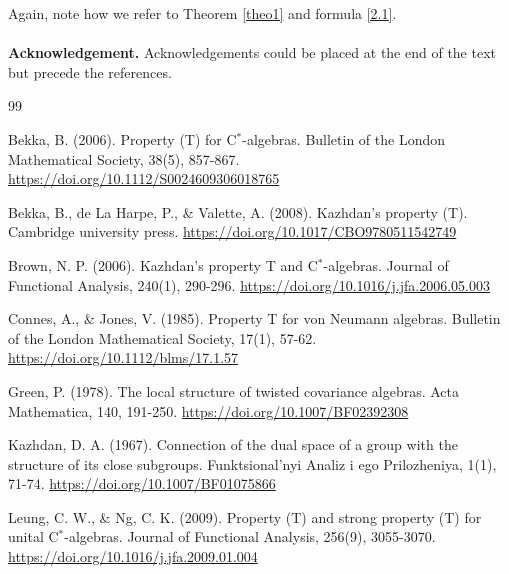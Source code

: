 \documentclass{article}
\begin{document}
Again, note how we refer to Theorem \ref{theo1} and formula \eqref{2.1}.
\\
\\
{\bf Acknowledgement.} Acknowledgements could be placed at the end
of the text but precede the references.



\begin{thebibliography}{99}

 Bekka, B. (2006). Property (T) for C$^*$-algebras. Bulletin of the London Mathematical Society, 38(5), 857-867.
\url{https://doi.org/10.1112/S0024609306018765}

  Bekka, B., de La Harpe, P., \& Valette, A. (2008). Kazhdan's property (T). Cambridge university press.
\url{https://doi.org/10.1017/CBO9780511542749}

 Brown, N. P. (2006). Kazhdan's property T and C$^*$-algebras. Journal of Functional Analysis, 240(1), 290-296.
\url{https://doi.org/10.1016/j.jfa.2006.05.003}


  Connes, A., \& Jones, V. (1985). Property T for von Neumann algebras. Bulletin of the London Mathematical Society, 17(1), 57-62.
\url{https://doi.org/10.1112/blms/17.1.57}

  Green, P. (1978). The local structure of twisted covariance algebras. Acta Mathematica, 140, 191-250.
\url{https://doi.org/10.1007/BF02392308}
    
 Kazhdan, D. A. (1967). Connection of the dual space of a group with the structure of its close subgroups. Funktsional'nyi Analiz i ego Prilozheniya, 1(1), 71-74.
\url{https://doi.org/10.1007/BF01075866}

 Leung, C. W., \& Ng, C. K. (2009). Property (T) and strong property (T) for unital C$^*$-algebras. Journal of Functional Analysis, 256(9), 3055-3070.
\url{https://doi.org/10.1016/j.jfa.2009.01.004}

\end{thebibliography}
\end{document}
